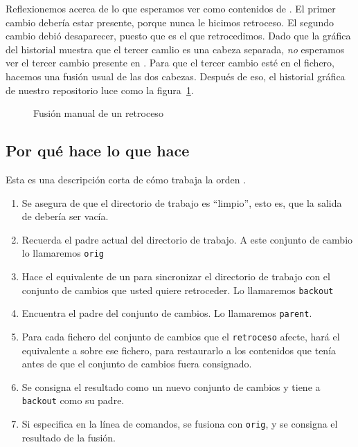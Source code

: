 Reflexionemos acerca de lo que esperamos ver como contenidos de
.  El primer cambio debería estar presente, porque
nunca le hicimos retroceso.  El segundo cambio debió desaparecer,
puesto que es el que retrocedimos.  Dado que la gráfica del historial
muestra que el tercer camlio es una cabeza separada, \emph{no}
esperamos ver el tercer cambio presente en .
Para que el tercer cambio esté en el fichero, hacemos una fusión usual
de las dos cabezas.
Después de eso, el historial gráfica de nuestro repositorio luce como
la figura~\ref{fig:undo:backout-manual-merge}.

\begin{figure}[htb]
  \centering
  \caption{Fusión manual de un retroceso}
  \label{fig:undo:backout-manual-merge}
\end{figure}

\subsection{Por qué  hace lo que hace}

Esta es una descripción corta de cómo trabaja la orden .
\begin{enumerate}
\item Se asegura de que el directorio de trabajo es ``limpio'', esto
  es, que la salida de  debería ser vacía.
\item Recuerda el padre actual del directorio de trabajo. A este
  conjunto de cambio lo llamaremos \texttt{orig}
\item Hace el equivalente de un  para sincronizar el
  directorio de trabajo con el conjunto de cambios que usted quiere
  retroceder. Lo llamaremos \texttt{backout}
\item Encuentra el padre del conjunto de cambios. Lo llamaremos
  \texttt{parent}.
\item Para cada fichero del conjunto de cambios que el
  \texttt{retroceso} afecte, hará el equivalente a
   sobre ese fichero, para restaurarlo a
  los contenidos que tenía antes de que el conjunto de cambios fuera
  consignado.
\item Se consigna el resultado como un nuevo conjunto de cambios y
  tiene a  \texttt{backout} como su padre.
\item Si especifica  en la línea de comandos,
  se fusiona con \texttt{orig}, y se consigna el resultado de la
  fusión.
\end{enumerate}

